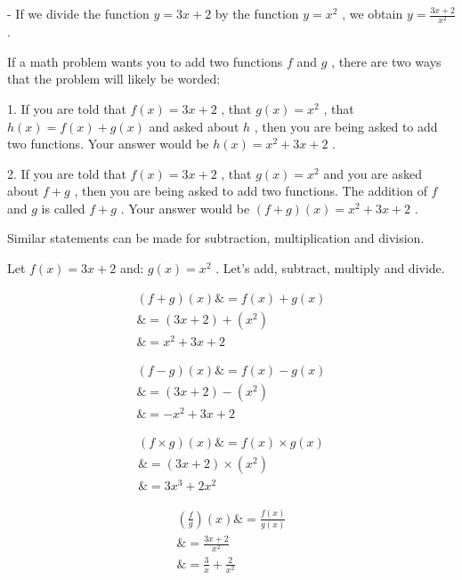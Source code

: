 -   If we divide the function $y=3x+2$ by the function $y=x^2$ , we obtain $y=\frac{3x+2}{x^2}$ .



If a math problem wants you to add two functions $f$ and $g$ , there are two ways that the
problem will likely be worded:



1.  If you are told that $f(x)=3x+2$ , that $g(x)=x^2$ , that $h(x)=f(x)+g(x)$ and asked
about $h$ , then you are being asked to add two functions. Your answer would be
$h(x)=x^2+3x+2$ .

2.  If you are told that $f(x)=3x+2$ , that $g(x)=x^2$ and you are asked about $f+g$ ,
then you are being asked to add two functions. The addition of $f$ and $g$ is called $f+g$
. Your answer would be $(f+g)(x)=x^2+3x+2$ .



Similar statements can be made for subtraction, multiplication and division.



Let $f(x)=3x+2$ and: $g(x)=x^2$ . Let's add, subtract, multiply and divide.



\begin{align}
(f+g)(x)
    \& = f(x)+g(x) \\
    \& = (3x+2)+(x^2) \\
    \& = x^2+3x+2 \,
\end{align}



\begin{align}
(f-g)(x)
    \& = f(x)-g(x) \\
    \& = (3x+2)-(x^2) \\
    \& = -x^2+3x+2 \,
\end{align}



\begin{align}
 (f\times g)(x)
          \& = f(x)\times g(x) \\
          \& = (3x+2)\times(x^2)\\
          \& = 3x^3+2x^2 \,
\end{align}



\begin{align}
\left(\frac{f}{g}\right)(x)
            \& = \frac{f(x)}{g(x)} \\
            \& = \frac{3x+2}{x^2} \\
            \& = \frac{3}{x}+\frac{2}{x^2}
\end{align}




